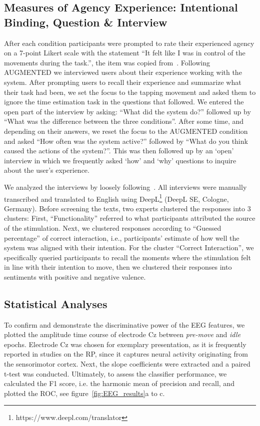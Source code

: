 \subsection{Measures of Agency Experience: Intentional Binding, Question \& Interview}%
After each condition participants were prompted to rate their experienced agency on a 7-point Likert scale with the statement ``It felt like I was in control of the movements during the task.'', the item was copied from~\cite{Bergstrom2022-fb}. Following AUGMENTED we interviewed users about their experience working with the system. After prompting users to recall their experience and summarize what their task had been, we set the focus to the tapping movement and asked them to ignore the time estimation task in the questions that followed. We entered the open part of the interview by asking: ``What did the system do?'' followed up by ``What was the difference between the three conditions''. After some time, and depending on their answers, we reset the focus to the AUGMENTED condition and asked ``How often was the system active?'' followed by ``What do you think caused the actions of the system?''. This was then followed up by an `open' interview in which we frequently asked `how' and `why' questions to inquire about the user's experience.

We analyzed the interviews by loosely following~\citet{Mayring2015-pp}. All interviews were manually transcribed and translated to English using DeepL\footnote{https://www.deepl.com/translator} (DeepL SE, Cologne, Germany). Before screening the texts, two experts clustered the responses into 3 clusters: First, ``Functionality'' referred to what participants attributed the source of the stimulation. Next, we clustered responses according to ``Guessed percentage'' of correct interaction, i.e., participants' estimate of how well the system was aligned with their intention. For the cluster ``Correct Interaction'', we specifically queried participants to recall the moments where the stimulation felt in line with their intention to move, then we clustered their responses into sentiments with positive and negative valence. 

\subsection{Statistical Analyses}
To confirm and demonstrate the discriminative power of the EEG features, we plotted the amplitude time course of electrode Cz between \textit{pre-move} and \textit{idle} epochs. Electrode Cz was chosen for exemplary presentation, as it is frequently reported in studies on the RP, since it captures neural activity originating from the sensorimotor cortex. Next, the slope coefficients were extracted and a paired t-test was conducted. Ultimately, to assess the classifier performance, we calculated the F1 score, i.e. the harmonic mean of precision and recall, and plotted the ROC, see figure~\ref{fig:EEG_results}a to c.

